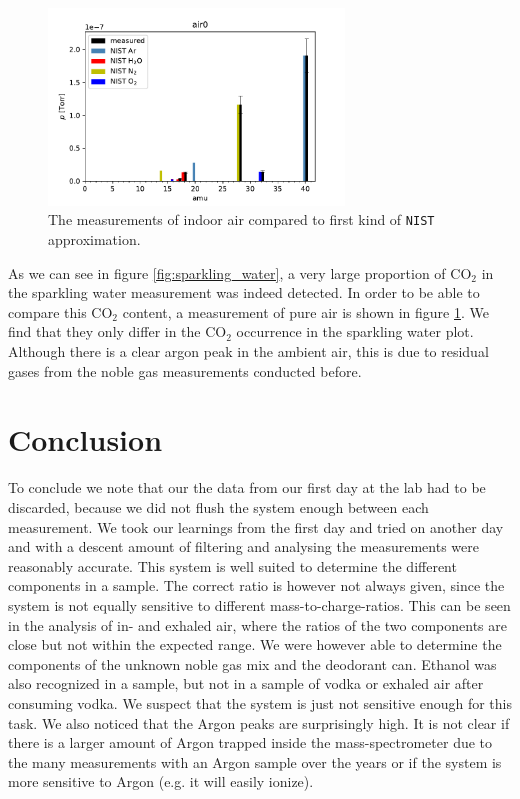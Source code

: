     
    
    \begin{figure}[h!]
    \centering
    \includegraphics[width=0.7\textwidth]{Report/DataResultsPlots/air0.pdf}
    \caption{The measurements of indoor air compared to first kind of \texttt{NIST} approximation.}
    \label{fig:air0}
    \end{figure}
    
    As we can see in figure \ref{fig:sparkling_water}, a very large proportion of CO$_2$ in the sparkling water measurement was indeed detected. In order to be able to compare this CO$_2$ content, a measurement of pure air is shown in figure \ref{fig:air0}. We find that they only differ in the CO$_2$ occurrence in the sparkling water plot. Although there is a clear argon peak in the ambient air, this is due to residual gases from the noble gas measurements conducted before. 
    
    
    \newpage


    \section{Conclusion}
    To conclude we note that our the data from our first day at the lab had to be discarded, because we did not flush the system enough between each measurement. We took our learnings from the first day and tried on another day and with a descent amount of filtering and analysing the measurements were reasonably accurate. This system is well suited to determine the different components in a sample. The correct ratio is however not always given, since the system is not equally sensitive to different mass-to-charge-ratios. This can be seen in the analysis of in- and exhaled air, where the ratios of the two components are close but not within the expected range. We were however able to determine the components of the unknown noble gas mix and the deodorant can. Ethanol was also recognized in a sample, but not in a sample of vodka or exhaled air after consuming vodka. We suspect that the system is just not sensitive enough for this task. We also noticed that the Argon peaks are surprisingly high. It is not clear if there is a larger amount of Argon trapped inside the mass-spectrometer due to the many measurements with an Argon sample over the years or if the system is more sensitive to Argon (e.g. it will easily ionize).
    
    
    \FloatBarrier
    